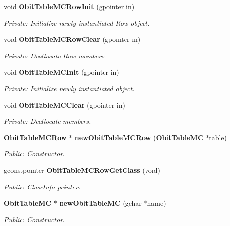 \begin{CompactItemize}
\item 
void {\bf Obit\-Table\-MCRow\-Init} (gpointer in)
\begin{CompactList}\small\item\em Private: Initialize newly instantiated Row object. \item\end{CompactList}\item 
void {\bf Obit\-Table\-MCRow\-Clear} (gpointer in)
\begin{CompactList}\small\item\em Private: Deallocate Row members. \item\end{CompactList}\item 
void {\bf Obit\-Table\-MCInit} (gpointer in)
\begin{CompactList}\small\item\em Private: Initialize newly instantiated object. \item\end{CompactList}\item 
void {\bf Obit\-Table\-MCClear} (gpointer in)
\begin{CompactList}\small\item\em Private: Deallocate members. \item\end{CompactList}\item 
{\bf Obit\-Table\-MCRow} $\ast$ {\bf new\-Obit\-Table\-MCRow} ({\bf Obit\-Table\-MC} $\ast$table)
\begin{CompactList}\small\item\em Public: Constructor. \item\end{CompactList}\item 
gconstpointer {\bf Obit\-Table\-MCRow\-Get\-Class} (void)
\begin{CompactList}\small\item\em Public: Class\-Info pointer. \item\end{CompactList}\item 
{\bf Obit\-Table\-MC} $\ast$ {\bf new\-Obit\-Table\-MC} (gchar $\ast$name)
\begin{CompactList}\small\item\em Public: Constructor. \item\end{CompactList}\item 

\end{CompactItemize}
